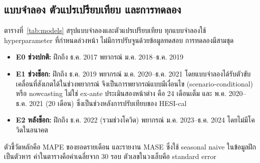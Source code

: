 \documentclass{article}
\theoremstyle{definition}
\begin{document}
\subsection{แบบจำลอง ตัวแปรเปรียบเทียบ และการทดลอง}
ตารางที่~\ref{tab:models} สรุปแบบจำลองและตัวแปรเปรียบเทียบ ทุกแบบจำลองใช้ hyperparameter ที่กำหนดล่วงหน้า ไม่มีการปรับจูนด้วยข้อมูลทดสอบ การทดลองมีสามชุด
\begin{itemize}
\item \textbf{E0 ช่วงปกติ:} ฝึกถึง ธ.ค. 2017 พยากรณ์ ม.ค. 2018--ธ.ค. 2019
\item \textbf{E1 ช่วงช็อก:} ฝึกถึง ธ.ค. 2019 พยากรณ์ ม.ค. 2020--ธ.ค. 2021 โดยแบบจำลองได้รับตัวขับเคลื่อนที่สังเกตได้ในช่วงพยากรณ์ จึงเป็นการพยากรณ์แบบมีเงื่อนไข (scenario-conditional) หรือ nowcasting ไม่ใช่ ex-ante ประเมินสองหน้าต่าง คือ 24 เดือนเต็ม และ พ.ค. 2020--ธ.ค. 2021 (20 เดือน) ซึ่งเป็นช่วงหลังการปรับเทียบของ HESI-cal
\item \textbf{E2 หลังช็อก:} ฝึกถึง ธ.ค. 2022 (รวมช่วงโควิด) พยากรณ์ ม.ค. 2023--ธ.ค. 2024 โดยไม่มีโควิดในอนาคต
\end{itemize}
ตัวชี้วัดหลักคือ MAPE ของยอดรายเดือน และรายงาน MASE ซึ่งใช้ seasonal naive ในข้อมูลฝึกเป็นตัวหาร ค่าในตารางคือค่าเฉลี่ยจาก 30 รอบ ตัวเลขในวงเล็บคือ standard error
\end{document}
